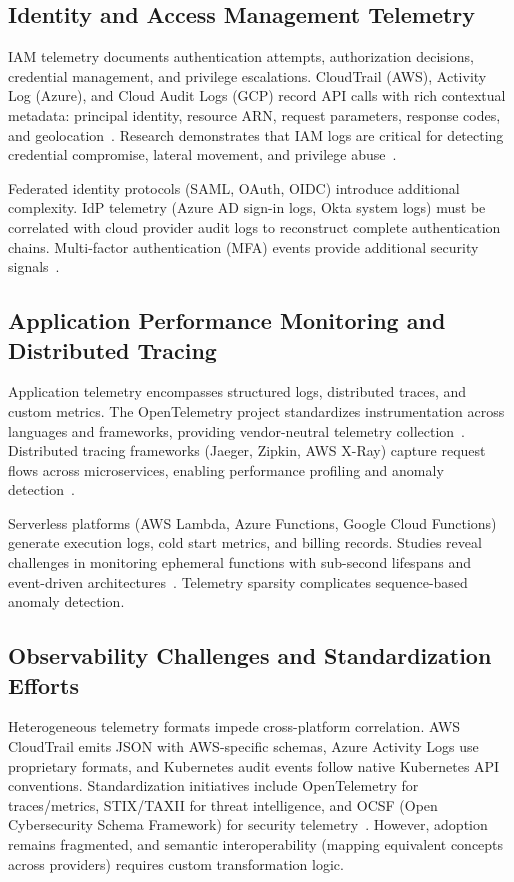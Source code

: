 \subsection{Identity and Access Management Telemetry}
IAM telemetry documents authentication attempts, authorization decisions, credential management, and privilege escalations. CloudTrail (AWS), Activity Log (Azure), and Cloud Audit Logs (GCP) record API calls with rich contextual metadata: principal identity, resource ARN, request parameters, response codes, and geolocation~\cite{awscloudtrail2023}. Research demonstrates that IAM logs are critical for detecting credential compromise, lateral movement, and privilege abuse~\cite{sun2018iamanalysis}.

Federated identity protocols (SAML, OAuth, OIDC) introduce additional complexity. IdP telemetry (Azure AD sign-in logs, Okta system logs) must be correlated with cloud provider audit logs to reconstruct complete authentication chains. Multi-factor authentication (MFA) events provide additional security signals~\cite{ometov2018mfa}.

\subsection{Application Performance Monitoring and Distributed Tracing}
Application telemetry encompasses structured logs, distributed traces, and custom metrics. The OpenTelemetry project standardizes instrumentation across languages and frameworks, providing vendor-neutral telemetry collection~\cite{opentelemetry2023}. Distributed tracing frameworks (Jaeger, Zipkin, AWS X-Ray) capture request flows across microservices, enabling performance profiling and anomaly detection~\cite{sambasivan2016tracing}.

Serverless platforms (AWS Lambda, Azure Functions, Google Cloud Functions) generate execution logs, cold start metrics, and billing records. Studies reveal challenges in monitoring ephemeral functions with sub-second lifespans and event-driven architectures~\cite{schwartz2021serverless}. Telemetry sparsity complicates sequence-based anomaly detection.

\subsection{Observability Challenges and Standardization Efforts}
Heterogeneous telemetry formats impede cross-platform correlation. AWS CloudTrail emits JSON with AWS-specific schemas, Azure Activity Logs use proprietary formats, and Kubernetes audit events follow native Kubernetes API conventions. Standardization initiatives include OpenTelemetry for traces/metrics, STIX/TAXII for threat intelligence, and OCSF (Open Cybersecurity Schema Framework) for security telemetry~\cite{ocsf2023}. However, adoption remains fragmented, and semantic interoperability (mapping equivalent concepts across providers) requires custom transformation logic.

